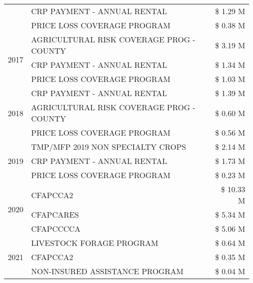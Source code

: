 \begin{tabular}{llr}
 & CRP PAYMENT - ANNUAL RENTAL & \$ 1.29 M \\
 & PRICE LOSS COVERAGE PROGRAM & \$ 0.38 M \\
\cline{1-3}
\multirow[t]{3}{*}{2017} & AGRICULTURAL RISK COVERAGE PROG - COUNTY & \$ 3.19 M \\
 & CRP PAYMENT - ANNUAL RENTAL & \$ 1.34 M \\
 & PRICE LOSS COVERAGE PROGRAM & \$ 1.03 M \\
\cline{1-3}
\multirow[t]{3}{*}{2018} & CRP PAYMENT - ANNUAL RENTAL & \$ 1.39 M \\
 & AGRICULTURAL RISK COVERAGE PROG - COUNTY & \$ 0.60 M \\
 & PRICE LOSS COVERAGE PROGRAM & \$ 0.56 M \\
\cline{1-3}
\multirow[t]{3}{*}{2019} & TMP/MFP 2019 NON SPECIALTY CROPS & \$ 2.14 M \\
 & CRP PAYMENT - ANNUAL RENTAL & \$ 1.73 M \\
 & PRICE LOSS COVERAGE PROGRAM & \$ 0.23 M \\
\cline{1-3}
\multirow[t]{3}{*}{2020} & CFAPCCA2 & \$ 10.33 M \\
 & CFAPCARES & \$ 5.34 M \\
 & CFAPCCCCA & \$ 5.06 M \\
\cline{1-3}
\multirow[t]{3}{*}{2021} & LIVESTOCK FORAGE PROGRAM & \$ 0.64 M \\
 & CFAPCCA2 & \$ 0.35 M \\
 & NON-INSURED ASSISTANCE PROGRAM & \$ 0.04 M \\
\cline{1-3}
\bottomrule
\end{tabular}
